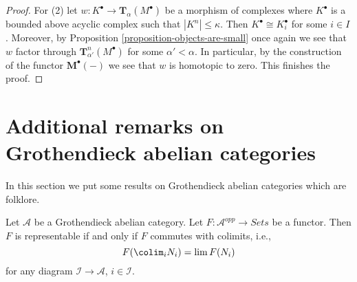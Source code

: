 \begin{proof}
\medskip\noindent
For (2) let $w : K^\bullet  \to \mathbf{T}_\alpha(M^\bullet)$
be a morphism of complexes where $K^\bullet$ is a bounded above acyclic
complex such that $|K^n| \leq \kappa$. Then $K^\bullet \cong K_i^\bullet$
for some $i \in I$. Moreover, by
Proposition \ref{proposition-objects-are-small}
once again we see that $w$ factor through
$\mathbf{T}^n_{\alpha'}(M^\bullet)$ for some $\alpha' < \alpha$.
In particular, by the construction of the functor
$\mathbf{M}^\bullet(-)$ we see that $w$ is homotopic to zero.
This finishes the proof.
\end{proof}






\section{Additional remarks on Grothendieck abelian categories}
\label{section-additional-Grothendieck}

\noindent
In this section we put some results on Grothendieck abelian categories
which are folklore.

\begin{lemma}
\label{lemma-grothendieck-brown}
Let $\mathcal{A}$ be a Grothendieck abelian category.
Let $F : \mathcal{A}^{opp} \to \textit{Sets}$ be a functor.
Then $F$ is representable if and only if $F$ commutes with colimits, i.e.,
$$
F(\colim_i N_i) = \lim F(N_i)
$$
for any diagram $\mathcal{I} \to \mathcal{A}$, $i \in \mathcal{I}$.
\end{lemma}

